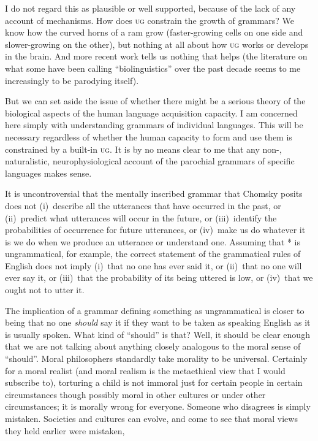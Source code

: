 \documentclass[output=paper]{langscibook}
\begin{document}
I do not regard this as plausible or well supported, because of the lack of any account of mechanisms.  How does \textsc{ug} constrain the growth of grammars? We know how the curved horns of a ram grow (faster-growing cells on one side and slower-growing on the other), but nothing at all about how \textsc{ug} works or develops in the brain. And more recent work tells us nothing that helps (the literature on what some have been calling ``biolinguistics'' over the past decade seems to me increasingly to be parodying itself).

But we can set aside the issue of whether there might be a serious theory of the biological aspects of the human language acquisition capacity. I am concerned here simply with understanding grammars of individual languages. This will be necessary regardless of whether the human capacity to form and use them is constrained by a built-in \textsc{ug}.  It is by no means clear to me that any non-, naturalistic, neurophysiological account of the parochial grammars of specific languages makes sense.

It is uncontroversial that the mentally inscribed grammar that Chomsky posits does not (i)~describe all the utterances that have occurred in the past, or (ii)~predict what utterances will occur in the future, or (iii)~identify the probabilities of occurrence for future utterances, or (iv)~make us do whatever it is we do when we produce an utterance or understand one.  Assuming that * is ungrammatical, for example, the correct statement of the grammatical rules of English does not imply (i)~that no one has ever said it, or (ii)~that no one will ever say it, or (iii)~that the probability of its being uttered is low, or (iv)~that we ought not to utter it.

The implication of a grammar defining something as ungrammatical is closer to being that no one \emph{should} say it if they want to be taken as speaking English as it is usually spoken.  What kind of ``should'' is that? Well, it should be clear enough that we are not talking about anything closely analogous to the moral sense of ``should''.  Moral philosophers standardly take morality to be universal.  Certainly for a moral realist (and moral realism is the metaethical view that I would subscribe to), torturing a child is not immoral just for certain people in certain circumstances though possibly moral in other cultures or under other circumstances; it is morally wrong for everyone.  Someone who disagrees is simply mistaken. Societies and cultures can evolve, and come to see that moral views they held earlier were mistaken,
\end{document}

